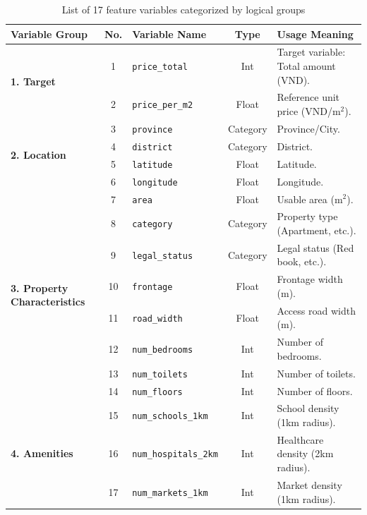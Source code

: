 \documentclass[12pt, a4paper]{article}
\begin{document}
\begin{table}[H]
\centering
\footnotesize
\renewcommand{\arraystretch}{1.05}
\begin{tabularx}{\textwidth}{|p{2.5cm}|c|p{3.2cm}|c|X|}
\hline
\textbf{Variable Group} & \textbf{No.} & \textbf{Variable Name} & \textbf{Type} & \textbf{Usage Meaning} \\ \hline
\multirow{2}{2.5cm}{\textbf{1. Target}} 
 & 1 & \texttt{price\_total} & Int & Target variable: Total amount (VND). \\ \cline{2-5}
 & 2 & \texttt{price\_per\_m2} & Float & Reference unit price (VND/m$^2$). \\ \hline
\multirow{4}{2.5cm}{\textbf{2. Location}} 
 & 3 & \texttt{province} & Category & Province/City. \\ \cline{2-5}
 & 4 & \texttt{district} & Category & District. \\ \cline{2-5}
 & 5 & \texttt{latitude} & Float & Latitude. \\ \cline{2-5}
 & 6 & \texttt{longitude} & Float & Longitude. \\ \hline
\multirow{8}{2.5cm}{\textbf{3. Property Characteristics}} 
 & 7 & \texttt{area} & Float & Usable area (m$^2$). \\ \cline{2-5}
 & 8 & \texttt{category} & Category & Property type (Apartment, etc.). \\ \cline{2-5}
 & 9 & \texttt{legal\_status} & Category & Legal status (Red book, etc.). \\ \cline{2-5}
 & 10 & \texttt{frontage} & Float & Frontage width (m). \\ \cline{2-5}
 & 11 & \texttt{road\_width} & Float & Access road width (m). \\ \cline{2-5}
 & 12 & \texttt{num\_bedrooms} & Int & Number of bedrooms. \\ \cline{2-5}
 & 13 & \texttt{num\_toilets} & Int & Number of toilets. \\ \cline{2-5}
 & 14 & \texttt{num\_floors} & Int & Number of floors. \\ \hline
\multirow{3}{2.5cm}{\textbf{4. Amenities}} 
 & 15 & \texttt{num\_schools\_1km} & Int & School density (1km radius). \\ \cline{2-5}
 & 16 & \texttt{num\_hospitals\_2km} & Int & Healthcare density (2km radius). \\ \cline{2-5}
 & 17 & \texttt{num\_markets\_1km} & Int & Market density (1km radius). \\ \hline
\end{tabularx}
\caption{List of 17 feature variables categorized by logical groups}
\label{tab:final_features_grouped}
\end{table}
\end{document}
